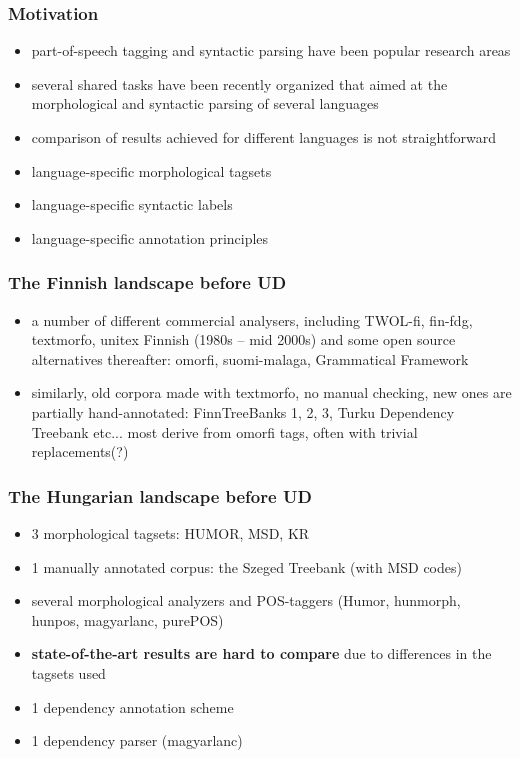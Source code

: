 \documentclass{beamer}
\begin{document}
\begin{frame}
\frametitle{Motivation}
\begin{itemize}
\item part-of-speech tagging and syntactic parsing have been popular research areas
\item several shared tasks have been recently organized that aimed at the morphological and syntactic parsing of several languages \cite{seddah-EtAl:2013:SPMRL,seddah-kubler-tsarfaty:2014:SPMRL-SANCL}
\item comparison of results achieved for different languages is not straightforward
\item language-specific morphological tagsets
\item language-specific syntactic labels
\item language-specific annotation principles
\end{itemize}
\end{frame}

\begin{frame}
\frametitle{The Finnish landscape before UD}
\begin{itemize}
\item a number of different commercial analysers, including TWOL-fi, fin-fdg,
    textmorfo, unitex Finnish (1980s -- mid 2000s) and some open source alternatives
    thereafter: omorfi, suomi-malaga, Grammatical Framework
\item similarly, old corpora made with textmorfo, no manual checking, new ones
    are partially hand-annotated: FinnTreeBanks 1, 2, 3,
    Turku Dependency Treebank etc... most derive from omorfi tags, often with
    trivial replacements(?)
\end{itemize}
\end{frame}

\begin{frame}
\frametitle{The Hungarian landscape before UD}
\begin{itemize}
\item 3 morphological tagsets: HUMOR, MSD, KR
\item 1 manually annotated corpus: the Szeged Treebank (with MSD codes)
\item several morphological analyzers and POS-taggers (Humor, hunmorph, hunpos, magyarlanc, purePOS)
\item \textbf{state-of-the-art results are hard to compare} due to differences in the tagsets used 
\item 1 dependency annotation scheme
\item 1 dependency parser (magyarlanc)
\end{itemize}
\end{frame}
\end{document}
